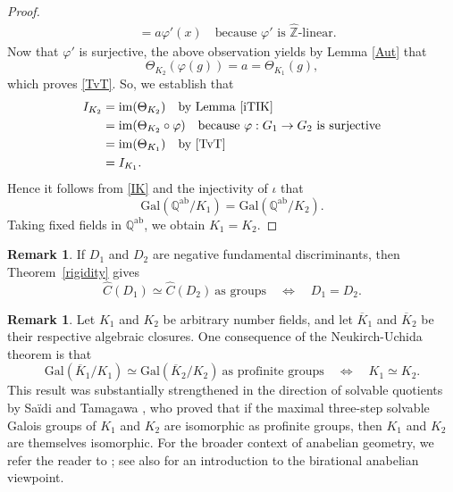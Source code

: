 \documentclass[reqno,11pt]{article}
\theoremstyle{plain} %
\theoremstyle{definition} %
\newtheorem{remark}[theorem]{\indent\sc Remark}
\begin{document}
\begin{proof}
\begin{align*}
&=a\varphi'(x)\quad\textrm{because $\varphi'$ is $\widehat{\mathbb{Z}}$-linear}.
\end{align*}
Now that $\varphi'$ is surjective, the above observation yields by Lemma \ref{Aut} that
\begin{equation*}
\Theta_{K_2}(\varphi(g))=a=\Theta_{K_1}(g), 
\end{equation*}
which proves \eqref{TvT}. 
So, we establish that
\begin{align*}
I_{K_2}&=\mathrm{im}(\Theta_{K_2})\quad\textrm{by Lemma \ref{iTIK}}\\
&=\mathrm{im}(\Theta_{K_2}\circ\varphi)\quad\textrm{because $\varphi:G_1\rightarrow G_2$
is surjective}\\
&=\mathrm{im}(\Theta_{K_1})\quad\textrm{by \eqref{TvT}}\\
&=I_{K_1}.
\end{align*}
Hence it follows from \eqref{IK} and the injectivity of $\iota$ that
\begin{equation*}
\mathrm{Gal}(\mathbb{Q}^\mathrm{ab}/K_1)=
\mathrm{Gal}(\mathbb{Q}^\mathrm{ab}/K_2).
\end{equation*}
Taking fixed fields in $\mathbb{Q}^\mathrm{ab}$, we obtain $K_1=K_2$.
\end{proof}

\begin{remark}
If $D_1$ and $D_2$ are negative fundamental discriminants, then
Theorem~\ref{rigidity} gives
\begin{equation*}
\widehat{C}(D_1)\simeq\widehat{C}(D_2)~\textrm{as groups}
\quad\Longleftrightarrow\quad D_1=D_2.
\end{equation*}
\end{remark}

\begin{remark}
Let $K_1$ and $K_2$ be arbitrary number fields,
and let $\overline{K}_1$ and
$\overline{K}_2$ be their respective algebraic closures. One
consequence of the Neukirch-Uchida theorem \cite{Neukirch69, Neukirch692, Uchida}
is that
\begin{equation*}
\mathrm{Gal}(\overline{K}_1/K_1)\simeq
\mathrm{Gal}(\overline{K}_2/K_2)~\textrm{as profinite groups}
\quad\Longleftrightarrow\quad K_1\simeq K_2. 
\end{equation*}
This result was substantially strengthened in the direction of
solvable quotients by Sa\"{i}di and Tamagawa \cite{S-T}, who proved
that if the maximal three-step solvable Galois groups of 
$K_1$ and $K_2$ are isomorphic as profinite groups, then $K_1$ and $K_2$
are themselves isomorphic.
For the broader context of anabelian geometry,
we refer the reader to \cite{Grothendieck, Mochizuki, Stix}; see also \cite{B-T} for an
introduction to the birational anabelian viewpoint.
\end{remark}
\end{document}
